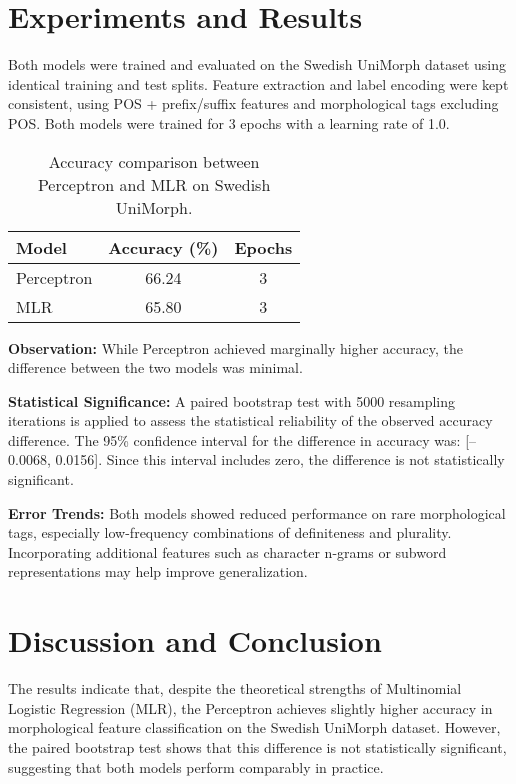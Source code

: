 \documentclass[11pt]{article}
\begin{document}
\section{Experiments and Results}
Both models were trained and evaluated on the Swedish UniMorph dataset using identical training and test splits. Feature extraction and label encoding were kept consistent, using POS + prefix/suffix features and morphological tags excluding POS. Both models were trained for 3 epochs with a learning rate of 1.0.

\begin{table}[h]
\centering
\begin{tabular}{lcc}
\hline
\textbf{Model} & \textbf{Accuracy (\%)} & \textbf{Epochs} \\
\hline
Perceptron & 66.24 & 3 \\
MLR        & 65.80 & 3 \\
\hline
\end{tabular}
\caption{Accuracy comparison between Perceptron and MLR on Swedish UniMorph.}
\end{table}

\textbf{Observation:} While Perceptron achieved marginally higher accuracy, the difference between the two models was minimal.

\textbf{Statistical Significance:} A paired bootstrap test with 5000 resampling iterations is applied to assess the statistical reliability of the observed accuracy difference. The 95\% confidence interval for the difference in accuracy was: [--0.0068, 0.0156]. Since this interval includes zero, the difference is not statistically significant.

\textbf{Error Trends:} Both models showed reduced performance on rare morphological tags, especially low-frequency combinations of definiteness and plurality. Incorporating additional features such as character n-grams or subword representations may help improve generalization.

\section{Discussion and Conclusion}
The results indicate that, despite the theoretical strengths of Multinomial Logistic Regression (MLR), the Perceptron achieves slightly higher accuracy in morphological feature classification on the Swedish UniMorph dataset. However, the paired bootstrap test shows that this difference is not statistically significant, suggesting that both models perform comparably in practice.
\end{document}
